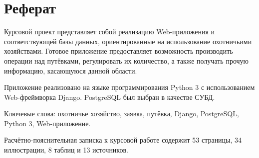 \section*{Реферат}
Курсовой проект представляет собой реализацию Web-приложения и соответствующей базы данных, ориентированные на использование охотничьими хозяйствами. Готовое приложение предоставляет возможность производить операции над путёвками, регулировать их количество, а также получать прочую информацию, касающуюся данной области.

Приложение реализовано на языке программирования Python 3 с использованием Web-фреймворка Django. PostgreSQL был выбран в качестве СУБД.

Ключевые слова: охотничье хозяйство, заявка, путёвка, Django, PostgreSQL, Python 3, Web-приложение.

Расчётно-пояснительная записка к курсовой работе содержит 53 страницы, 34 иллюстрации, 8 таблиц и 13 источников.